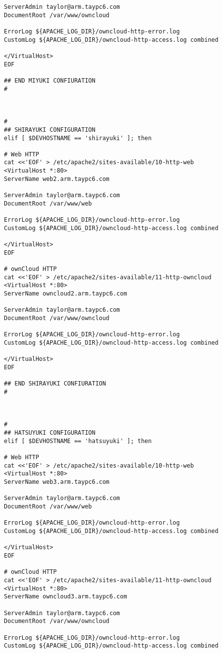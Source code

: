 \documentclass[12pt]{spieman}  %
\begin{document}
\begin{lstlisting}
ServerAdmin taylor@arm.taypc6.com
DocumentRoot /var/www/owncloud

ErrorLog ${APACHE_LOG_DIR}/owncloud-http-error.log
CustomLog ${APACHE_LOG_DIR}/owncloud-http-access.log combined

</VirtualHost>
EOF

## END MIYUKI CONFIURATION
#



#
## SHIRAYUKI CONFIGURATION
elif [ $DEVHOSTNAME == 'shirayuki' ]; then

# Web HTTP
cat <<'EOF' > /etc/apache2/sites-available/10-http-web
<VirtualHost *:80>
ServerName web2.arm.taypc6.com

ServerAdmin taylor@arm.taypc6.com
DocumentRoot /var/www/web

ErrorLog ${APACHE_LOG_DIR}/owncloud-http-error.log
CustomLog ${APACHE_LOG_DIR}/owncloud-http-access.log combined

</VirtualHost>
EOF

# ownCloud HTTP
cat <<'EOF' > /etc/apache2/sites-available/11-http-owncloud
<VirtualHost *:80>
ServerName owncloud2.arm.taypc6.com

ServerAdmin taylor@arm.taypc6.com
DocumentRoot /var/www/owncloud

ErrorLog ${APACHE_LOG_DIR}/owncloud-http-error.log
CustomLog ${APACHE_LOG_DIR}/owncloud-http-access.log combined

</VirtualHost>
EOF

## END SHIRAYUKI CONFIURATION
#



#
## HATSUYUKI CONFIGURATION
elif [ $DEVHOSTNAME == 'hatsuyuki' ]; then

# Web HTTP
cat <<'EOF' > /etc/apache2/sites-available/10-http-web
<VirtualHost *:80>
ServerName web3.arm.taypc6.com

ServerAdmin taylor@arm.taypc6.com
DocumentRoot /var/www/web

ErrorLog ${APACHE_LOG_DIR}/owncloud-http-error.log
CustomLog ${APACHE_LOG_DIR}/owncloud-http-access.log combined

</VirtualHost>
EOF

# ownCloud HTTP
cat <<'EOF' > /etc/apache2/sites-available/11-http-owncloud
<VirtualHost *:80>
ServerName owncloud3.arm.taypc6.com

ServerAdmin taylor@arm.taypc6.com
DocumentRoot /var/www/owncloud

ErrorLog ${APACHE_LOG_DIR}/owncloud-http-error.log
CustomLog ${APACHE_LOG_DIR}/owncloud-http-access.log combined


\end{lstlisting}
\end{document}
